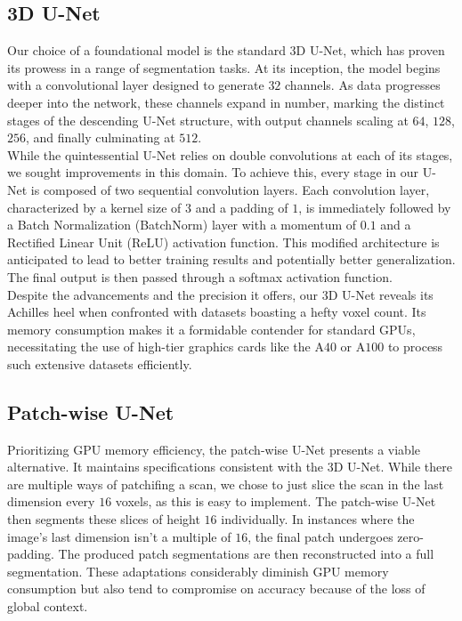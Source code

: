 \subsection{3D U-Net}
Our choice of a foundational model is the standard $3$D U-Net, which has proven its prowess in a range of segmentation tasks.
At its inception, the model begins with a convolutional layer designed to generate $32$ channels. As data progresses deeper into the network, these channels expand in number,
marking the distinct stages of the descending U-Net structure, with output channels scaling at $64$, $128$, $256$, and finally culminating at $512$.\\[1ex]
While the quintessential U-Net relies on double convolutions at each of its stages, we sought improvements in this domain. To achieve this,
every stage in our U-Net is composed of two sequential convolution layers. Each convolution layer, characterized by a kernel size of $3$ and a padding of $1$,
is immediately followed by a Batch Normalization (BatchNorm) layer with a momentum of $0.1$ and a Rectified Linear Unit (ReLU) activation function.
This modified architecture is anticipated to lead to better training results and potentially better generalization\cite[7-8]{ioffe_batch_2015}.
The final output is then passed through a softmax activation function.\\[1ex]
Despite the advancements and the precision it offers, our $3$D U-Net reveals its Achilles heel when confronted with datasets boasting a hefty voxel count.
Its memory consumption makes it a formidable contender for standard GPUs, necessitating the use of high-tier graphics cards like the A$40$ or A$100$ to process such extensive datasets efficiently.

\subsection{Patch-wise U-Net}
Prioritizing GPU memory efficiency, the patch-wise U-Net presents a viable alternative. It maintains specifications consistent with the $3$D U-Net.
While there are multiple ways of patchifing a scan, we chose to just slice the scan in the last dimension every $16$ voxels, as this is easy to implement.
The patch-wise U-Net then segments these slices of height $16$ individually.
In instances where the image's last dimension isn't a multiple of $16$, the final patch undergoes zero-padding.
The produced patch segmentations are then reconstructed into a full segmentation.
These adaptations considerably diminish GPU memory consumption but also tend to compromise on accuracy because of the loss of global context.

